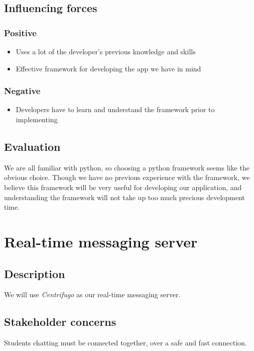 \documentclass[12pt, a4paper]{article}
\begin{document}
\subsection{Influencing forces}
\begin{minipage}[t]{0.5\textwidth}
    \subsubsection*{Positive}
    \begin{itemize}
        \item Uses a lot of the developer's previous knowledge and skills
        \item Effective framework for developing the app we have in mind
    \end{itemize}
\end{minipage}%
\begin{minipage}[t]{0.5\textwidth}
    \subsubsection*{Negative}
    \begin{itemize}
        \item Developers have to learn and understand the framework prior to implementing
    \end{itemize}
\end{minipage}

\subsection{Evaluation}
We are all familiar with python, so choosing a python framework seems like the obvious choice. Though we have no previous experience with the framework, we believe this framework will be very useful for developing our application, and understanding the framework will not take up too much precious development time.

\newpage
\section{Real-time messaging server} %
\subsection{Description}
We will use \emph{Centrifugo} as our real-time messaging server.
\subsection{Stakeholder concerns}
Students chatting must be connected together, over a safe and fast connection.
\end{document}
